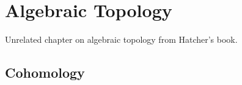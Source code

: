 \chapter{Algebraic Topology}
Unrelated chapter on algebraic topology from Hatcher's book.

\section{Cohomology}


